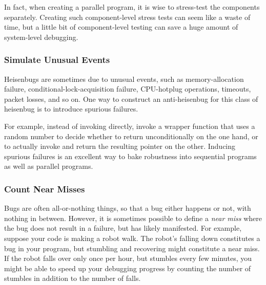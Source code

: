In fact, when creating a parallel program, it is wise to stress-test
the components separately.
Creating such component-level stress tests can seem like a waste of time,
but a little bit of component-level testing can save a huge amount
of system-level debugging.

\subsubsection{Simulate Unusual Events}
\label{sec:debugging:Simulate Unusual Events}

Heisenbugs are sometimes due to unusual events, such as
memory-allocation failure, conditional-lock-acquisition failure,
CPU-hotplug operations, timeouts, packet losses, and so on.
One way to construct an anti-heisenbug for this class of heisenbug
is to introduce spurious failures.

For example, instead of invoking  directly, invoke
a wrapper function that uses a random number to decide whether
to return  unconditionally on the one hand, or to actually
invoke  and return the resulting pointer on the other.
Inducing spurious failures is an excellent way to bake robustness into
sequential programs as well as parallel programs.

\QuickQuizEnd

\subsubsection{Count Near Misses}
\label{sec:debugging:Count Near Misses}

Bugs are often all-or-nothing things, so that a bug either happens
or not, with nothing in between.
However, it is sometimes possible to define a \emph{near miss} where
the bug does not result in a failure, but has likely manifested.
For example, suppose your code is making a robot walk.
The robot's falling down constitutes a bug in your program, but
stumbling and recovering might constitute a near miss.
If the robot falls over only once per hour, but stumbles every few
minutes, you might be able to speed up your debugging progress by
counting the number of stumbles in addition to the number of falls.

